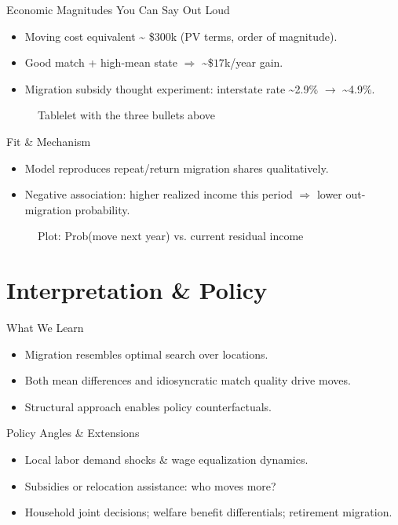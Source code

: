 \documentclass[aspectratio=169,professionalfonts]{beamer}
\newcommand{\figph}[2][0.9\linewidth]{%
  \begin{figure}
    \centering
    \fbox{\rule{0pt}{0.55#1}\rule{#1}{0pt}}%
    \caption{#2}
  \end{figure}
}
\newcommand{\figph}[1]{\begin{center}\fbox{\parbox{0.85\linewidth}{\centering \vspace{0.6em} \textit{#1} \vspace{0.6em}}}\end{center}}
\begin{document}
\begin{frame}{Economic Magnitudes You Can Say Out Loud}
  \begin{itemize}
    \item Moving cost equivalent \~{} \$$300$k (PV terms, order of magnitude).
    \item Good match + high-mean state \texorpdfstring{$\Rightarrow$}{->} \~{}\$$17$k/year gain.
    \item Migration subsidy thought experiment: interstate rate \textasciitilde{}2.9\% \texorpdfstring{$\rightarrow$}{->} \textasciitilde{}4.9\%.
  \end{itemize}
  \figph{Tablelet with the three bullets above}
\end{frame}

\begin{frame}{Fit \& Mechanism}
  \begin{itemize}
    \item Model reproduces repeat/return migration shares qualitatively.
    \item Negative association: higher realized income this period $\Rightarrow$ lower out-migration probability.
  \end{itemize}
  \figph{Plot: Prob(move next year) vs. current residual income}
\end{frame}

\section{Interpretation \& Policy}

\begin{frame}{What We Learn}
  \begin{itemize}
    \item Migration resembles optimal search over locations.
    \item Both mean differences and idiosyncratic match quality drive moves.
    \item Structural approach enables policy counterfactuals.
  \end{itemize}
\end{frame}

\begin{frame}{Policy Angles \& Extensions}
  \begin{itemize}
    \item Local labor demand shocks \& wage equalization dynamics.
    \item Subsidies or relocation assistance: who moves more?
    \item Household joint decisions; welfare benefit differentials; retirement migration.
  \end{itemize}
\end{frame}
\end{document}
